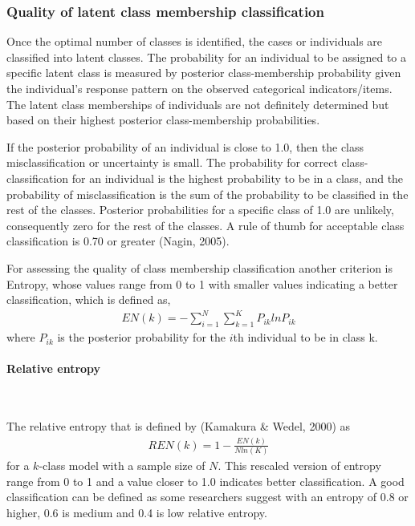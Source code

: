 \documentclass[12pt,a4paper,oneside]{reedthesis}
\begin{document}
\hypertarget{quality-of-latent-class-membership-classification}{%
\subsubsection{Quality of latent class membership classification}\label{quality-of-latent-class-membership-classification}}

Once the optimal number of classes is identified, the cases or individuals are classified into latent classes. The probability for an individual to be assigned to a specific latent class is measured by posterior class-membership probability given the individual's response pattern on the observed categorical indicators/items. The latent class memberships of individuals are not definitely determined but based on their highest posterior class-membership probabilities.

If the posterior probability of an individual is close to 1.0, then the class misclassification or uncertainty is small. The probability for correct class-classification for an individual is the highest probability to be in a class, and the probability of misclassification is the sum of the probability to be classified in the rest of the classes. Posterior probabilities for a specific class of 1.0 are unlikely, consequently zero for the rest of the classes. A rule of thumb for acceptable class classification is 0.70 or greater (Nagin, 2005).

For assessing the quality of class membership classification another criterion is Entropy, whose values range from 0 to 1 with smaller values indicating a better classification, which is defined as,
\begin{align}
EN(k) = - \sum^N_{i=1} \sum^K_{k=1}P_{ik} ln P_{ik}
\end{align}
where \(P_{ik}\) is the posterior probability for the \(i\)th individual to be in class k.

\hypertarget{relative-entropy}{%
\paragraph{Relative entropy}\label{relative-entropy}}

~

The relative entropy that is defined by (Kamakura \& Wedel, 2000) as
\begin{align}
REN(k) = 1-\frac{EN(k)}{N ln(K)}
\end{align}
for a \(k\)-class model with a sample size of \(N\). This rescaled version of entropy range from 0 to 1 and a value closer to 1.0 indicates better classification. A good classification can be defined as some researchers suggest with an entropy of 0.8 or higher, 0.6 is medium and 0.4 is low relative entropy.
\end{document}
